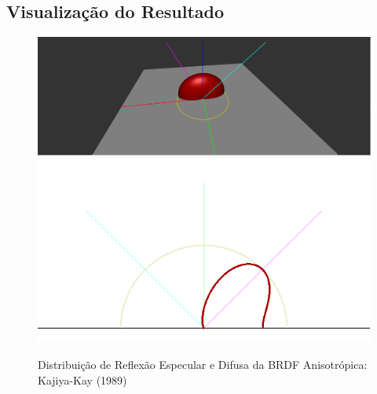 \subsection{Visualização do Resultado}

\begin{figure}[H]
    \caption{\small{Distribuição de Reflexão Especular e Difusa da BRDF Anisotrópica: Kajiya-Kay (1989)}}\label{fig-kajiya-plots}
    \vspace{42px}
  \includegraphics[width=\linewidth]{./Imagens/brdfs/aniso-3D-plot}
\endminipage\hfill
{}
  \includegraphics[width=\linewidth]{./Imagens/brdfs/aniso-polar-plot.png}
\endminipage\hfill
\end{figure}

